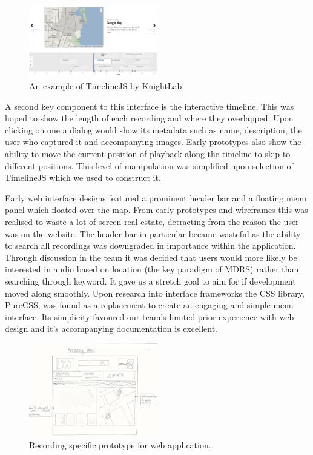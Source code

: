 \documentclass{l3proj}
\begin{document}
\begin{figure}[ht!]
\centering
\includegraphics[width=0.5\textwidth]{images/timeline-example.png}
\caption{An example of TimelineJS by KnightLab.}
\end{figure}

A second key component to this interface is the interactive timeline. This was hoped to show the length of each recording and where they overlapped. Upon clicking on one a dialog would show its metadata such as name, description, the user who captured it and accompanying images. Early prototypes also show the ability to move the current position of playback along the timeline to skip to different positions. This level of manipulation was simplified upon selection of TimelineJS which we used to construct it.

Early web interface designs featured a prominent header bar and a floating menu panel which floated over the map. From early prototypes and wireframes this was realised to waste a lot of screen real estate, detracting from the reason the user was on the website. The header bar in particular became wasteful as the ability to search all recordings was downgraded in importance within the application. Through discussion in the team it was decided that users would more likely be interested in audio based on location (the key paradigm of MDRS) rather than searching through keyword. It gave us a stretch goal to aim for if development moved along smoothly. Upon research into interface frameworks the CSS library, PureCSS, was found as a replacement to create an engaging and simple menu interface. Its simplicity favoured our team's limited prior experience with web design and it’s accompanying documentation is excellent.

\begin{figure}[ht!]
\centering
\includegraphics[width=0.5\textwidth]{images/web-recording-view.jpg}
\caption{Recording specific prototype for web application.}
\end{figure}
\end{document}
